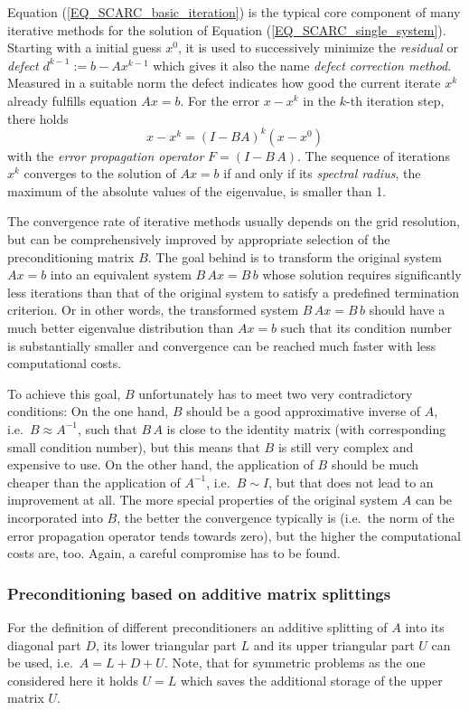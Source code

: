 Equation (\ref{EQ_SCARC_basic_iteration}) is the typical core component of many iterative methods for the solution of Equation (\ref{EQ_SCARC_single_system}).
Starting with a initial guess $x^0$, it is used to successively minimize the {\it residual} or {\it defect}  $d^{k-1}:=b-A x^{k-1}$ which gives it also the name {\it defect correction method}.
Measured in a suitable norm the defect indicates how good the current iterate $x^k$ already fulfills equation $Ax=b$.
For the error $x-x^k$ in the $k$-th iteration step, there holds 
 \[ x-x^k = (I- B A)^k (x-x^0)\]
with the {\it error propagation operator} $F=(I- B \,A)$. The sequence of iterations $x^k$ converges to the solution of $Ax=b$ if and only if its {\it spectral radius}, the maximum of the absolute values of the eigenvalue, is smaller than 1. 

The convergence rate of iterative methods usually depends on the grid resolution, but can be comprehensively improved by appropriate selection of the preconditioning matrix $B$.
The goal behind is to transform the original system $Ax=b$  into an equivalent system $B\,Ax=B\,b$ whose solution requires significantly less iterations than that of the original system to satisfy a predefined termination criterion.
Or in other words, the transformed system $B\,Ax=B\,b$ should have a much better eigenvalue distribution than $Ax=b$ such that its condition number is substantially smaller and convergence can be reached much faster with less computational costs.

To achieve this goal, $B$ unfortunately has to meet two very contradictory conditions:
On the one hand, $B $ should be a good approximative inverse of $A$, i.e.\ $B \approx A^{-1}$, such that $B\,A$ is close to the identity matrix (with corresponding small condition number), but this means that $B$ is still very complex and expensive to use.
On the other hand, the application of $B$ should be much cheaper than the application of $A^{-1}$, i.e.\ $B \sim I$,  but that does not lead to an improvement at all. The more special properties of the original system $A$ can be incorporated into $B$, the better the convergence typically  is (i.e.\ the norm of the error propagation operator tends towards zero), but the higher the computational costs are, too. 
Again, a careful compromise has to be found.

\subsubsection{Preconditioning based on additive matrix splittings}
For the definition of different preconditioners an additive 
splitting of $A$ into its diagonal part $D$, its lower triangular part $L$ and its upper triangular part $U$ can be used, i.e.\ $A=L + D+U$. Note, that for symmetric problems as the one considered here it holds $U=L$ which saves the additional storage of the upper matrix $U$.

